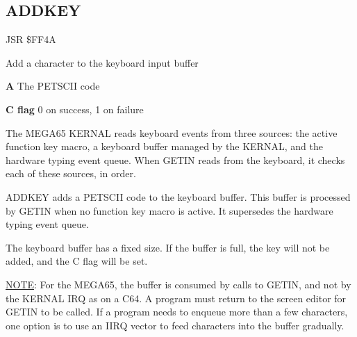 \subsection{ADDKEY}
\label{KERNAL Jump Table!ADDKEY}
\begin{description}[leftmargin=2cm,style=nextline]
    \item [Address:] JSR \$FF4A
    \item [Description:] Add a character to the keyboard input buffer
    \item [Inputs:]
        \textbf{A} The PETSCII code
    \item [Outputs:]
        \textbf{C flag} 0 on success, 1 on failure
    \item [Remarks:]
        The MEGA65 KERNAL reads keyboard events from three sources: the active function key macro, a keyboard buffer managed by the KERNAL, and the hardware typing event queue. When GETIN reads from the keyboard, it checks each of these sources, in order.

        ADDKEY adds a PETSCII code to the keyboard buffer. This buffer is processed by GETIN when no function key macro is active. It supersedes the hardware typing event queue.

        The keyboard buffer has a fixed size. If the buffer is full, the key will not be added, and the C flag will be set.

        \underline{NOTE}: For the MEGA65, the buffer is consumed by calls to GETIN, and not by the KERNAL IRQ as on a C64. A program must return to the screen editor for GETIN to be called. If a program needs to enqueue more than a few characters, one option is to use an IIRQ vector to feed characters into the buffer gradually.

    \item [Example:]

\end{description}



\newpage
